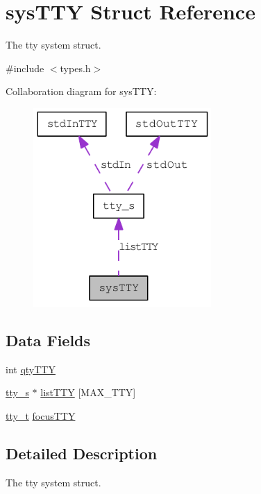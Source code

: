 \hypertarget{structsys_t_t_y}{
\section{sysTTY Struct Reference}
\label{structsys_t_t_y}
}


The tty system struct.  




{\ttfamily \#include $<$types.h$>$}



Collaboration diagram for sysTTY:\nopagebreak
\begin{figure}[H]
\begin{center}
\leavevmode
\includegraphics[width=192pt]{structsys_t_t_y__coll__graph}
\end{center}
\end{figure}
\subsection*{Data Fields}
\begin{DoxyCompactItemize}
\item 
int \hyperlink{structsys_t_t_y_a0bc680aada6c6392e4613573f212438b}{qtyTTY}
\item 
\hyperlink{structtty__s}{tty\_\-s} $\ast$ \hyperlink{structsys_t_t_y_a35ea653106226d6fe2191f4f8a203d67}{listTTY} \mbox{[}MAX\_\-TTY\mbox{]}
\item 
\hyperlink{types_8h_a10bbb7176245baeab9f398547c410779}{tty\_\-t} \hyperlink{structsys_t_t_y_ad4f84dd55c369a7bd7d9f562fc76662f}{focusTTY}
\end{DoxyCompactItemize}


\subsection{Detailed Description}
The tty system struct. 

